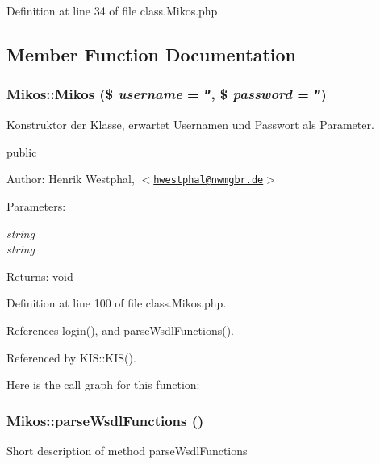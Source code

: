 Definition at line 34 of file class.Mikos.php.

\subsection{Member Function Documentation}
\hypertarget{class_mikos_e653539dab7aa9260811a9743fe5bffd}{
\subsubsection{\setlength{\rightskip}{0pt plus 5cm}Mikos::Mikos (\$ {\em username} = {\tt ''}, \$ {\em password} = {\tt ''})}}
\label{class_mikos_e653539dab7aa9260811a9743fe5bffd}


Konstruktor der Klasse, erwartet Usernamen und Passwort als Parameter.

public \begin{Desc}
\item[Author:]Henrik Westphal, $<$\href{mailto:hwestphal@nwmgbr.de}{\tt hwestphal@nwmgbr.de}$>$ \end{Desc}
\begin{Desc}
\item[Parameters:]
\begin{description}
\item[{\em string}]\item[{\em string}]\end{description}
\end{Desc}
\begin{Desc}
\item[Returns:]void \end{Desc}


Definition at line 100 of file class.Mikos.php.

References login(), and parseWsdlFunctions().

Referenced by KIS::KIS().

Here is the call graph for this function:\hypertarget{class_mikos_9882b0b15e6bd279d143069fed3e93be}{
\subsubsection{\setlength{\rightskip}{0pt plus 5cm}Mikos::parseWsdlFunctions ()}}
\label{class_mikos_9882b0b15e6bd279d143069fed3e93be}


Short description of method parseWsdlFunctions

